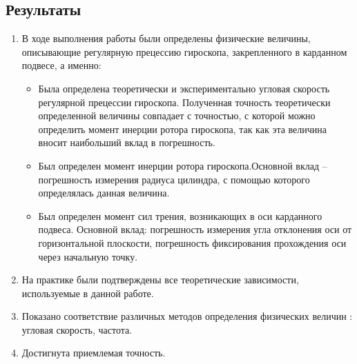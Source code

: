 \documentclass[a4paper,12pt]{article}
\begin{document}
\begin{center}
\section{Результаты}
\end{center}

\begin{enumerate}
	\item В ходе выполнения работы были определены физические величины, описывающие регулярную прецессию гироскопа, закрепленного в карданном подвесе, а именно:
		\begin{itemize}
			\item Была определена теоретически и экспериментально угловая скорость регулярной прецессии гироскопа. Полученная точность теоретически определенной величины совпадает с точностью, с которой можно определить момент инерции ротора гироскопа, так как эта величина вносит наибольший вклад в погрешность.
			\item Был определен момент инерции ротора гироскопа.Основной вклад -- погрешность измерения радиуса цилиндра, с помощью которого определялась данная величина.
			\item Был определен момент сил трения, возникающих в оси карданного подвеса. Основной вклад: погрешность измерения угла отклонения оси от горизонтальной плоскости, погрешность фиксирования прохождения оси через начальную точку.
		\end{itemize}
	\item На практике были подтверждены все теоретические зависимости, используемые в данной работе.
	\item Показано соответствие различных методов определения физических величин : угловая скорость, частота.
	\item Достигнута приемлемая точность.
\end{enumerate}
\end{document}
